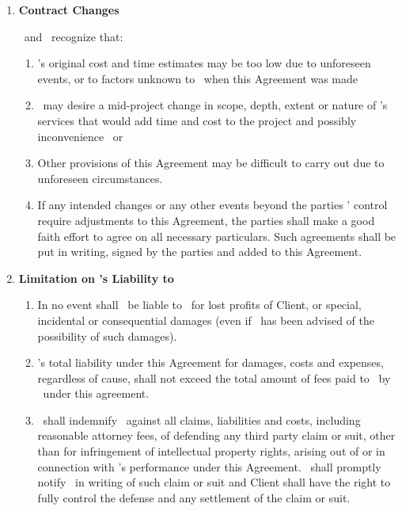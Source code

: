 \documentclass[a4paper,10pt,notitlepage,twocolumn]{article}
\begin{document}
\begin{enumerate}
\item \textbf{Contract Changes}

\clref\ and \cntrref\ recognize that:
\begin{enumerate}

	\item \cntrref 's original cost and time estimates may be too low due to unforeseen events, or to factors unknown to \cntrref\ when this Agreement was made

	\item \clref\ may desire a mid-project change in scope, depth, extent or nature of \cntrref 's services that would add time and cost to the project and possibly inconvenience \cntrref\, or

	\item Other provisions of this Agreement may be difficult to carry out due to unforeseen circumstances.
	
	\item If any intended changes or any other events beyond the parties ' control require adjustments to this Agreement, the parties shall make a good faith effort to agree on all necessary particulars. Such agreements shall be put in writing, signed by the parties and added to this Agreement.
\end{enumerate}

\item \textbf{Limitation on \cntrref 's Liability to \clref}
\begin{enumerate}
  \item In no event shall \cntrref\ be liable to \clref\ for lost profits of Client, or special, incidental or consequential damages (even if \cntrref\ has been advised of the possibility of such damages).

\item \cntrref 's total liability under this Agreement for damages, costs and expenses, regardless of cause, shall not exceed the total amount of fees paid to \cntrref\ by \clref\ under this agreement.

\item \clref\ shall indemnify \cntrref\ against all claims, liabilities and costs, including reasonable attorney fees, of defending any third party claim or suit, other than for infringement of intellectual property rights, arising out of or in connection with \cntrref 's performance under this Agreement. \cntrref\ shall promptly notify \clref\ in writing of such claim or suit and Client shall have the right to fully control the defense and any settlement of the claim or suit.	
\end{enumerate}


\end{enumerate}
\end{document}
